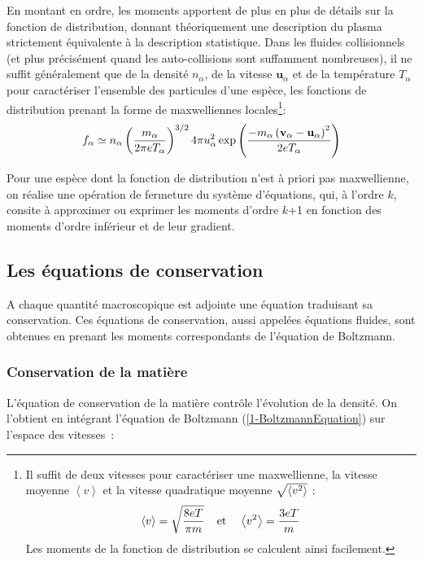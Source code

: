 \begin{refsection}
En montant en ordre, les moments apportent de plus en plus de détails sur la
fonction de distribution, donnant théoriquement une description du plasma
strictement équivalente à la description statistique. Dans les fluides
collisionnels (et plus précisément quand les auto-collisions sont suffamment
nombreuses), il ne suffit généralement que de la densité $n_\alpha$, de la
vitesse $\mathbf{u}_\alpha$ et de la température $T_\alpha$ pour caractériser l'ensemble des particules d'une espèce, les fonctions de distribution
prenant la forme de maxwelliennes locales\footnote{Il suffit de deux vitesses
pour caractériser une maxwellienne, la vitesse moyenne $\left<v\right>$ et la vitesse quadratique moyenne $\sqrt{\left<v^{{2}}\right>}$ :
$$
	\left<v\right>=\sqrt{\frac{8eT}{\pi m}} \;\;\;\;\text{et}\;\;\;\; 
	\left<v^{{2}}\right>=\frac{3eT}{m}
$$ 
Les moments de la fonction de distribution se calculent ainsi facilement.}:
\begin{equation}
\label{1-MaxwellDistribution}
	f_\alpha\simeq n_\alpha
	\left(\frac{m_\alpha}{2\pi
	eT_\alpha}\right)^{{3/2}}4\pi
	u_\alpha^{{2}}\exp\left(\frac{-m_\alpha \left(\mathbf
	v_\alpha-\mathbf u_\alpha\right)^{{2}}}{2eT_\alpha}\right)
\end{equation}

Pour une espèce dont la fonction de distribution n'est à priori pas
maxwellienne, on réalise une opération de fermeture du système d'équations, qui,
à l'ordre $k$, consite à approximer ou exprimer les moments d'ordre $k$+1
en fonction des moments d'ordre inférieur et de leur gradient.

\subsection{Les équations de conservation}

A chaque quantité macroscopique est adjointe une équation traduisant sa
conservation. Ces équations de conservation, aussi appelées équations fluides,
sont obtenues en prenant les moments correspondants de l'équation de Boltzmann.

\subsubsection{Conservation de la matière}
L'équation de conservation de la matière contrôle
l'évolution de la densité. On l'obtient en intégrant
l'équation de Boltzmann (\eqref{1-BoltzmannEquation}) sur l'espace des
vitesses~:


\end{refsection}
